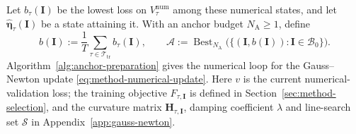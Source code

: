 Let $b_\tau(\mathbf I)$ be the lowest loss on
$V_\tau^{\mathrm{num}}$ among these numerical states, and let
$\widehat{\boldsymbol\eta}_\tau(\mathbf I)$ be a state attaining it.
With an anchor budget $N_{\mathrm A}\ge1$, define
\begin{equation}
    b(\mathbf I):=\frac1T\sum_{\tau\in\mathcal T_{\mathrm{tr}}}
        b_\tau(\mathbf I),
    \qquad
    \mathcal A:=\operatorname{Best}_{N_{\mathrm A}}
        \bigl(\{(\mathbf I,b(\mathbf I)):
            \mathbf I\in\mathcal B_0\}\bigr).
    \label{eq:appendix-anchor-selection}
\end{equation}
Algorithm~\ref{alg:anchor-preparation} gives the numerical loop for
the Gauss--Newton update \eqref{eq:method-numerical-update}.
Here $v$ is the current numerical-validation loss;
the training objective $F_{\tau,\mathbf I}$ is defined in
Section~\ref{sec:method-selection}, and the curvature matrix
$\mathbf H_{\tau,\mathbf I}$, damping coefficient $\lambda$ and
line-search set $\mathcal S$ in Appendix~\ref{app:gauss-newton}.

